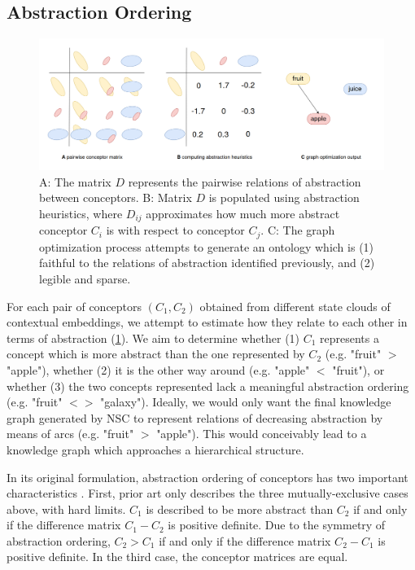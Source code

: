 \subsection{Abstraction Ordering}

\begin{figure}[h]
    \centering
    \includegraphics[width=\textwidth]{img/conceptors-graph.png}
    \caption{A: The matrix $D$ represents the pairwise relations of abstraction between conceptors. B: Matrix $D$ is populated using abstraction heuristics, where $D_{ij}$ approximates how much more abstract conceptor $C_i$ is with respect to conceptor $C_j$. C: The graph optimization process attempts to generate an ontology which is (1) faithful to the relations of abstraction identified previously, and (2) legible and sparse.}\label{fig:conceptors-graph}
\end{figure}

For each pair of conceptors $(C_1, C_2)$ obtained from different state clouds of contextual embeddings, we attempt to estimate how they relate to each other in terms of abstraction (\ref{fig:conceptors-graph}). We aim to determine whether (1) $C_1$ represents a concept which is more abstract than the one represented by $C_2$ (e.g. "fruit" $>$ "apple"), whether (2) it is the other way around (e.g. "apple" $<$ "fruit"), or whether (3) the two concepts represented lack a meaningful abstraction ordering (e.g. "fruit" $<>$ "galaxy"). Ideally, we would only want the final knowledge graph generated by NSC to represent relations of decreasing abstraction by means of arcs (e.g. "fruit" $>$ "apple"). This would conceivably lead to a knowledge graph which approaches a hierarchical structure.

In its original formulation, abstraction ordering of conceptors has two important characteristics \citep{jaeger_controlling_2017}. First, prior art only describes the three mutually-exclusive cases above, with hard limits. $C_1$ is described to be more abstract than $C_2$ if and only if the difference matrix $C_1 - C_2$ is positive definite. Due to the symmetry of abstraction ordering, $C_2 > C_1$ if and only if the difference matrix $C_2 - C_1$ is positive definite. In the third case, the conceptor matrices are equal.

